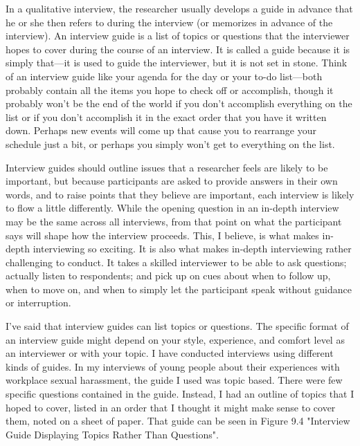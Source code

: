 In a qualitative interview, the researcher usually develops a guide in advance that he or she then refers to during the interview (or memorizes in advance of the interview). An interview guide is a list of topics or questions that the interviewer hopes to cover during the course of an interview. It is called a guide because it is simply that—it is used to guide the interviewer, but it is not set in stone. Think of an interview guide like your agenda for the day or your to-do list—both probably contain all the items you hope to check off or accomplish, though it probably won’t be the end of the world if you don’t accomplish everything on the list or if you don’t accomplish it in the exact order that you have it written down. Perhaps new events will come up that cause you to rearrange your schedule just a bit, or perhaps you simply won’t get to everything on the list.

Interview guides should outline issues that a researcher feels are likely to be important, but because participants are asked to provide answers in their own words, and to raise points that they believe are important, each interview is likely to flow a little differently. While the opening question in an in-depth interview may be the same across all interviews, from that point on what the participant says will shape how the interview proceeds. This, I believe, is what makes in-depth interviewing so exciting. It is also what makes in-depth interviewing rather challenging to conduct. It takes a skilled interviewer to be able to ask questions; actually listen to respondents; and pick up on cues about when to follow up, when to move on, and when to simply let the participant speak without guidance or interruption.

I’ve said that interview guides can list topics or questions. The specific format of an interview guide might depend on your style, experience, and comfort level as an interviewer or with your topic. I have conducted interviews using different kinds of guides. In my interviews of young people about their experiences with workplace sexual harassment, the guide I used was topic based. There were few specific questions contained in the guide. Instead, I had an outline of topics that I hoped to cover, listed in an order that I thought it might make sense to cover them, noted on a sheet of paper. That guide can be seen in Figure 9.4 "Interview Guide Displaying Topics Rather Than Questions".

